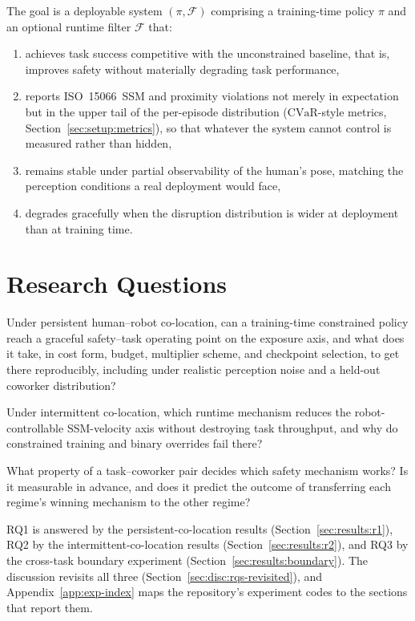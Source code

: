 \documentclass[11pt,a4paper]{report}
\newcommand{\ssm}{SSM}
\newcommand{\iso}{ISO~15066}
\newcommand{\cvar}{\ensuremath{\mathrm{CVaR}}}
\begin{document}
The goal is a deployable system $(\pi, \mathcal{F})$ comprising a
training-time policy $\pi$ and an optional runtime filter
$\mathcal{F}$ that:
\begin{enumerate}[topsep=2pt,itemsep=1pt]
\item achieves task success competitive with the unconstrained
  baseline, that is, improves safety without materially degrading
  task performance,
\item reports \iso{}~\ssm{} and proximity violations not merely in
  expectation but in the upper tail of the per-episode distribution
  (\cvar{}-style metrics, Section~\ref{sec:setup:metrics}), so that
  whatever the system cannot control is measured rather than hidden,
\item remains stable under partial observability of the human's pose,
  matching the perception conditions a real deployment would face,
\item degrades gracefully when the disruption distribution is wider
  at deployment than at training time.
\end{enumerate}

\section{Research Questions}
\label{sec:intro:rqs}

\begin{description}[leftmargin=2em,style=nextline]
\item[RQ1 (the persistent regime)] Under persistent human--robot
  co-location, can a training-time constrained policy reach a graceful
  safety--task operating point on the exposure axis, and what does it
  take, in cost form, budget, multiplier scheme, and checkpoint
  selection, to get there reproducibly, including under realistic
  perception noise and a held-out coworker distribution?
\item[RQ2 (the intermittent regime)] Under intermittent co-location,
  which runtime mechanism reduces the robot-controllable
  \ssm{}-velocity axis without destroying task throughput, and why do
  constrained training and binary overrides fail there?
\item[RQ3 (the boundary)] What property of a task--coworker pair
  decides which safety mechanism works? Is it measurable in advance,
  and does it predict the outcome of transferring each regime's
  winning mechanism to the other regime?
\end{description}

RQ1 is answered by the persistent-co-location results
(Section~\ref{sec:results:r1}), RQ2 by the intermittent-co-location
results (Section~\ref{sec:results:r2}), and RQ3 by the cross-task
boundary experiment (Section~\ref{sec:results:boundary}). The
discussion revisits all three
(Section~\ref{sec:disc:rqs-revisited}), and
Appendix~\ref{app:exp-index} maps the repository's experiment codes
to the sections that report them.
\end{document}

